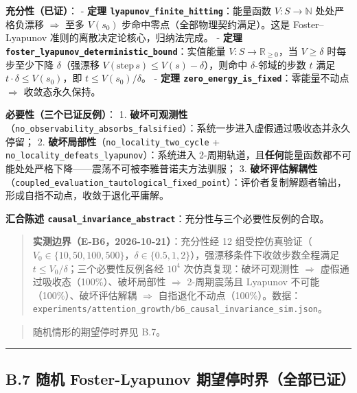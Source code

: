 \textbf{充分性（已证）}： - \textbf{定理
\texttt{lyapunov\_finite\_hitting}}：能量函数 \(V : S \to \mathbb{N}\)
处处严格负漂移 \(\Rightarrow\) 至多 \(V(s_0)\)
步命中零点（全部物理契约满足）。这是 Foster--Lyapunov
准则的离散决定论核心，归纳法完成。 - \textbf{定理
\texttt{foster\_lyapunov\_deterministic\_bound}}：实值能量
\(V : S \to \mathbb{R}_{\ge 0}\)，当 \(V \ge \delta\) 时每步至少下降
\(\delta\)（强漂移 \(V(\text{step}\,s) \le V(s)-\delta\)），则命中
\(\delta\)-邻域的步数 \(t\) 满足 \(t \cdot \delta \le V(s_0)\)，即
\(t \le V(s_0)/\delta\)。 - \textbf{定理
\texttt{zero\_energy\_is\_fixed}}：零能量不动点 \(\Rightarrow\)
收敛态永久保持。

\textbf{必要性（三个已证反例）}： 1.
\textbf{破坏可观测性}（\texttt{no\_observability\_absorbs\_falsified}）：系统一步进入虚假通过吸收态并永久停留；
2. \textbf{破坏局部性}（\texttt{no\_locality\_two\_cycle} +
\texttt{no\_locality\_defeats\_lyapunov}）：系统进入
2-周期轨道，且\textbf{任何}能量函数都不可能处处严格下降------震荡不可被李雅普诺夫方法驯服；
3.
\textbf{破坏评估解耦性}（\texttt{coupled\_evaluation\_tautological\_fixed\_point}）：评价者复制解题者输出，形成自指不动点，收敛于退化平庸解。

\textbf{汇合陈述
\texttt{causal\_invariance\_abstract}}：充分性与三个必要性反例的合取。

\begin{quote}
\textbf{实测边界（E-B6，2026-10-21）}：充分性经 12
组受控仿真验证（\(V_0 \in \{10,50,100,500\}\)，\(\delta \in \{0.5,1,2\}\)），强漂移条件下收敛步数全程满足
\(t \le V_0/\delta\)；三个必要性反例各经 \(10^4\)
次仿真复现：破坏可观测性 \(\Rightarrow\)
虚假通过吸收态（100\%）、破坏局部性 \(\Rightarrow\) 2-周期震荡且
Lyapunov 不可能（100\%）、破坏评估解耦 \(\Rightarrow\)
自指退化不动点（100\%）。数据：\texttt{experiments/attention\_growth/b6\_causal\_invariance\_sim.json}。
\end{quote}

\begin{quote}
随机情形的期望停时界见 B.7。
\end{quote}

\begin{center}\rule{0.5\linewidth}{0.5pt}\end{center}

\subsection{B.7 随机 Foster-Lyapunov
期望停时界（全部已证）}\label{b.7-ux968fux673a-foster-lyapunov-ux671fux671bux505cux65f6ux754cux5168ux90e8ux5df2ux8bc1}

